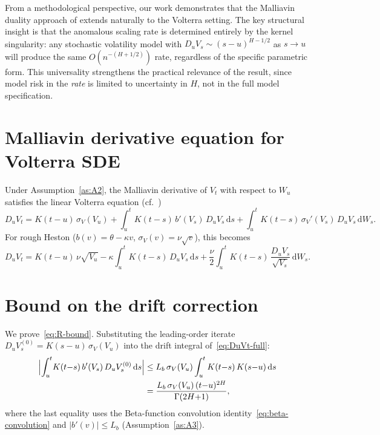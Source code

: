 \documentclass[12pt]{article}
\theoremstyle{definition}
\newcommand{\dd}{\mathrm{d}}
\begin{document}
From a methodological perspective, our work demonstrates that the
Malliavin duality approach of \citet{AlosFukasawa2021} extends
naturally to the Volterra setting.
The key structural insight is that the anomalous scaling rate is
determined entirely by the kernel singularity: any stochastic
volatility model with $D_u V_s \sim (s{-}u)^{H-1/2}$ as $s \to u$
will produce the same $O(n^{-(H+1/2)})$ rate, regardless of the
specific parametric form.
This universality strengthens the practical relevance of the result,
since model risk in the \emph{rate} is limited to uncertainty in $H$,
not in the full model specification.

\appendix

\section{Malliavin derivative equation for Volterra SDE}
\label{app:malliavin-eq}

Under Assumption~\ref{as:A2}, the Malliavin derivative of
$V_t$ with respect to $W_u$ satisfies the linear Volterra equation
(cf.\ \citealt{AlosLeonVives2007,Nualart2006})
\begin{equation}\label{eq:DuVt-full}
  D_u V_t = K(t{-}u)\,\sigma_V(V_u)
  + \int_u^t\! K(t{-}s)\,b'(V_s)\,D_u V_s\,\dd s
  + \int_u^t\! K(t{-}s)\,
    \sigma_V'(V_s)\,D_u V_s\,\dd W_s.
\end{equation}
For rough Heston ($b(v) = \theta - \kappa v$,
$\sigma_V(v) = \nu\sqrt{v}$), this becomes
\begin{equation}\label{eq:DuVt-rH}
  D_u V_t = K(t{-}u)\,\nu\sqrt{V_u}
  - \kappa\!\int_u^t\! K(t{-}s)\,D_u V_s\,\dd s
  + \frac{\nu}{2}\!\int_u^t\! K(t{-}s)\,
    \frac{D_u V_s}{\sqrt{V_s}}\,\dd W_s.
\end{equation}

\section{Bound on the drift correction}\label{app:drift-bound}

We prove~\eqref{eq:R-bound}. Substituting the leading-order iterate
$D_u V_s^{(0)} = K(s{-}u)\,\sigma_V(V_u)$ into the drift integral
of~\eqref{eq:DuVt-full}:
\begin{align}\label{eq:drift-correction-app}
  \Bigl|\int_u^t\! K(t{-}s)\,b'(V_s)\,D_u V_s^{(0)}\,\dd s\Bigr|
  &\le L_b\,\sigma_V(V_u)
     \int_u^t K(t{-}s)\,K(s{-}u)\,\dd s \notag\\
  &= \frac{L_b\,\sigma_V(V_u)\,(t{-}u)^{2H}}{\Gamma(2H{+}1)},
\end{align}
where the last equality uses the Beta-function convolution
identity~\eqref{eq:beta-convolution}
and $|b'(v)| \le L_b$ (Assumption~\ref{as:A3}).
\end{document}
